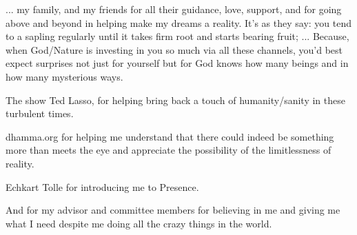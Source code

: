 ... my family, and my friends for all their guidance, love, support, and for going above and beyond in helping make my dreams a reality. It's as they say: you tend to a sapling regularly until it takes firm root and starts bearing fruit; ... Because, when God/Nature is investing in you so much via all these channels, you'd best expect surprises not just for yourself but for God knows how many beings and in how many mysterious ways.

The show Ted Lasso, for helping bring back a touch of humanity/sanity in these turbulent times.

dhamma.org for helping me understand that there could indeed be something more than meets the eye and appreciate the possibility of the limitlessness of reality.

Echkart Tolle for introducing me to Presence.

And for my advisor and committee members for believing in me and giving me what I need despite me doing all the crazy things in the world.